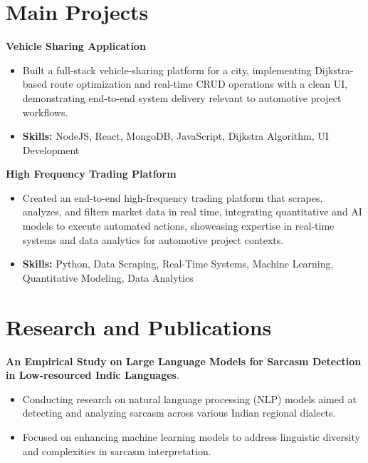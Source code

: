 \documentclass[a4paper,11pt]{article}
\begin{document}
\section{\textbf{Main Projects}}

\vspace{1mm}
  \textbf{Vehicle Sharing Application  }
\vspace{-1.5mm} %
\begin{itemize}
  \item Built a full-stack vehicle-sharing platform for a city, implementing Dijkstra-based route optimization and real-time CRUD operations with a clean UI, demonstrating end-to-end system delivery relevant to automotive project workflows.
\vspace{-3mm}
  \item \textbf{Skills:} NodeJS, React, MongoDB, JavaScript, Dijkstra Algorithm, UI Development
\end{itemize}


\vspace{1mm}
   \textbf{High Frequency Trading Platform }
\vspace{-1.5mm} %
\begin{itemize}
  \item Created an end-to-end high-frequency trading platform that scrapes, analyzes, and filters market data in real time, integrating quantitative and AI models to execute automated actions, showcasing expertise in real-time systems and data analytics for automotive project contexts.
\vspace{-3mm}
  \item \textbf{Skills:} Python, Data Scraping, Real-Time Systems, Machine Learning, Quantitative Modeling, Data Analytics
\end{itemize}



\section{\textbf{Research and Publications} \hfill }
\vspace{1mm}
  \textbf{An Empirical Study on Large Language Models for Sarcasm Detection in Low-resourced Indic Languages}.
\vspace{-1mm} %
\begin{itemize}
  \item Conducting research on natural language processing (NLP) models aimed at detecting and analyzing sarcasm across various Indian regional dialects.
\vspace{-3mm}
  \item Focused on enhancing machine learning models to address linguistic diversity and complexities in sarcasm interpretation.
\end{itemize}
\end{document}
